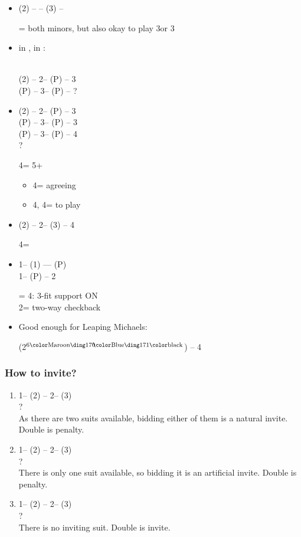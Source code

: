 \documentclass[12pt, a4paper]{article}
\begin{document}
\begin{itemize}
\item (2\spades) -- \dbl -- (3\spades) -- \dbl

\dbl = both minors, but also okay to play 3\spades\dbl or 3\nt

\item \gf in , \soff in :

 \\
(2\spades) -- 2\nt -- (P) -- 3\diams \\
(P) -- 3\hearts -- (P) -- ?

\item
(2\spades) -- 2\nt -- (P) -- 3\clubs \\
(P) -- 3\diams -- (P) -- 3\spades \\
(P) -- 3\nt -- (P) -- 4\clubs \\
?

4\clubs = 5+\clubs
\begin{itemize}
    \item 4\diams = agreeing \clubs
    \item 4\hearts, 4\nt = to play
\end{itemize}

\item 
(2\hearts) -- 2\nt -- (3\hearts) -- 4\hearts 

4\hearts = \trsf{\spades}

\item 
1\clubs -- (1\spades) --\dbl -- (P) \\
1\nt -- (P) -- 2\diams

\dbl = 4\hearts: 3-fit support ON\\
2\diams = two-way checkback

\item Good enough for Leaping Michaels:\\

(2\diams$^\text{6\major}$) -- 4\clubs

\end{itemize}

\subsubsection*{How to invite?}
\begin{enumerate}
    \item {
        1\spades -- (2\clubs) -- 2\spades -- (3\clubs)\\
        ?\\
        As there are two suits available, bidding either of them is a natural
        invite. Double is penalty.
    }
    \item {
        1\spades -- (2\diams) -- 2\spades -- (3\diams)\\
        ?\\
        There is only one suit available, so bidding it is an artificial invite.
        Double is penalty.
    }
    \item {
        1\spades -- (2\hearts) -- 2\spades -- (3\hearts)\\
        ?\\
        There is no inviting suit. Double is invite.
    }
\end{enumerate}
\end{document}
